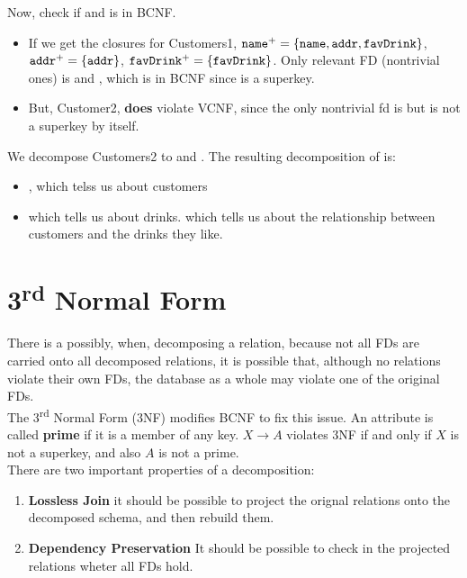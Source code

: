 \documentclass[11pt,a4paper,twocolumn]{book}
\begin{document}
Now, check if  and  is in BCNF.

\begin{itemize}
\item If we get the closures for Customers1, $\texttt{name}^+ = \{ \texttt{name}, \texttt{addr}, \texttt{favDrink} \}$, $\texttt{addr}^+ = \{ \texttt{addr} \}$, $\texttt{favDrink}^+ = \{ \texttt{favDrink} \}$. Only relevant FD (nontrivial ones) is  and , which is in BCNF since  is a superkey.

\item But, Customer2, \customerso \textbf{does} violate VCNF, since the only nontrivial fd is  but  is not a superkey by itself.
\end{itemize}

We decompose Customers2 to  and . The resulting decomposition of \customerst is:

\begin{itemize}
\item {}, which telss us about customers
\item {} which tells us about drinks.
 which tells us about the relationship between customers and the drinks they like.
\end{itemize}

\section{3\textsuperscript{rd} Normal Form}

There is a possibly, when, decomposing a relation, because not all FDs are carried onto all decomposed relations, it is possible that, although no relations violate their own FDs, the database as a whole may violate one of the original FDs.\\

The 3\textsuperscript{rd} Normal Form (3NF) modifies BCNF to fix this issue. An attribute is called \textbf{prime} if it is a member of any key. $X \to A$ violates 3NF if and only if $X$ is not a superkey, and also $A$ is not a prime.\\

There are two important properties of a decomposition:

\begin{enumerate}
\item \textbf{Lossless Join} it should be possible to project the orignal relations onto the decomposed schema, and then rebuild them.
\item \textbf{Dependency Preservation} It should be possible to check in the projected relations wheter all FDs hold.
\end{enumerate}
\end{document}
